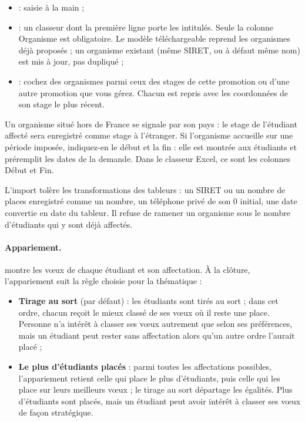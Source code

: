 \documentclass[11pt,a4paper]{article}
\begin{document}
\begin{itemize}
  \item {} : saisie à la main ;
  \item {} : un classeur dont la première
        ligne porte les intitulés. Seule la colonne \og Organisme\fg{} est
        obligatoire. Le modèle téléchargeable reprend les organismes déjà
        proposés ; un organisme existant (même SIRET, ou à défaut même nom) est
        mis à jour, pas dupliqué ;
  \item {} : cochez des organismes parmi
        ceux des stages de cette promotion ou d'une autre promotion que vous
        gérez. Chacun est repris avec les coordonnées de son stage le plus
        récent.
\end{itemize}


Un organisme situé hors de France se signale par son pays : le stage de
l'étudiant affecté sera enregistré comme stage à l'étranger. Si l'organisme
accueille sur une période imposée, indiquez-en le début et la fin : elle est
montrée aux étudiants et préremplit les dates de la demande. Dans le classeur
Excel, ce sont les colonnes \og Début\fg{} et \og Fin\fg{}.

L'import tolère les transformations des tableurs : un SIRET ou un nombre de
places enregistré comme un nombre, un téléphone privé de son 0 initial, une date
convertie en date du tableur. Il refuse de ramener un organisme sous le nombre
d'étudiants qui y sont déjà affectés.

\paragraph{Appariement.}  montre les vœux de chaque
étudiant et son affectation. À la clôture, l'appariement suit la règle choisie
pour la thématique :

\begin{itemize}
  \item \textbf{Tirage au sort} (par défaut) : les étudiants sont tirés au sort ;
        dans cet ordre, chacun reçoit le mieux classé de ses vœux où il reste une
        place. Personne n'a intérêt à classer ses vœux autrement que selon ses
        préférences, mais un étudiant peut rester sans affectation alors qu'un
        autre ordre l'aurait placé ;
  \item \textbf{Le plus d'étudiants placés} : parmi toutes les affectations
        possibles, l'appariement retient celle qui place le plus d'étudiants,
        puis celle qui les place sur leurs meilleurs vœux ; le tirage au sort
        départage les égalités. Plus d'étudiants sont placés, mais un étudiant
        peut avoir intérêt à classer ses vœux de façon stratégique.
\end{itemize}
\end{document}
